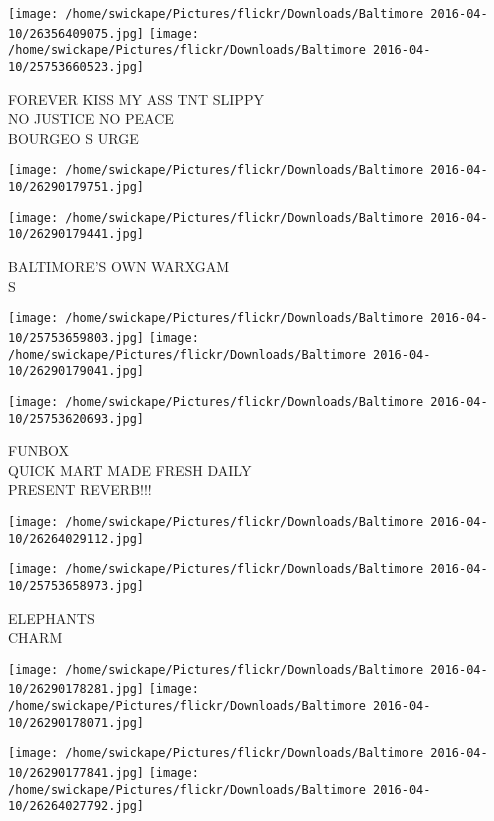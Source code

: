 \documentclass[10pt,letterpaper]{article}
\begin{document}
\vspace{0.25in}
\texttt{[image: /home/swickape/Pictures/flickr/Downloads/Baltimore 2016-04-10/26356409075.jpg]}
\texttt{[image: /home/swickape/Pictures/flickr/Downloads/Baltimore 2016-04-10/25753660523.jpg]}

FOREVER KISS MY ASS TNT SLIPPY\\
NO JUSTICE NO PEACE\\
BOURGEO S URGE
\pagebreak

\texttt{[image: /home/swickape/Pictures/flickr/Downloads/Baltimore 2016-04-10/26290179751.jpg]}

\vspace{0.25in}
\texttt{[image: /home/swickape/Pictures/flickr/Downloads/Baltimore 2016-04-10/26290179441.jpg]}

BALTIMORE'S OWN WARXGAM\\
S
\pagebreak

\texttt{[image: /home/swickape/Pictures/flickr/Downloads/Baltimore 2016-04-10/25753659803.jpg]}
\texttt{[image: /home/swickape/Pictures/flickr/Downloads/Baltimore 2016-04-10/26290179041.jpg]}

\vspace{0.25in}
\texttt{[image: /home/swickape/Pictures/flickr/Downloads/Baltimore 2016-04-10/25753620693.jpg]}

FUNBOX\\
QUICK MART MADE FRESH DAILY\\
PRESENT REVERB!!!
\pagebreak

\texttt{[image: /home/swickape/Pictures/flickr/Downloads/Baltimore 2016-04-10/26264029112.jpg]}

\vspace{0.25in}
\texttt{[image: /home/swickape/Pictures/flickr/Downloads/Baltimore 2016-04-10/25753658973.jpg]}

ELEPHANTS\\
CHARM
\pagebreak

\texttt{[image: /home/swickape/Pictures/flickr/Downloads/Baltimore 2016-04-10/26290178281.jpg]}
\texttt{[image: /home/swickape/Pictures/flickr/Downloads/Baltimore 2016-04-10/26290178071.jpg]}

\texttt{[image: /home/swickape/Pictures/flickr/Downloads/Baltimore 2016-04-10/26290177841.jpg]}
\texttt{[image: /home/swickape/Pictures/flickr/Downloads/Baltimore 2016-04-10/26264027792.jpg]}
\end{document}
